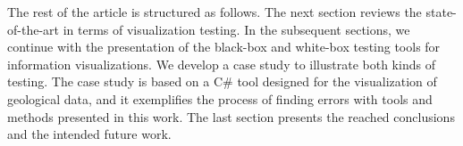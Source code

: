 The rest of the article is structured as follows. The next section reviews the state-of-the-art in terms of visualization testing. In the subsequent sections, we continue with the presentation of the black-box and white-box testing tools for information visualizations.
We develop a case study to illustrate both kinds of testing. The case study is based on a C\# tool designed for the visualization of geological data, and it exemplifies the process of finding errors with tools and methods presented in this work.
The last section presents the reached conclusions and the intended future work.
